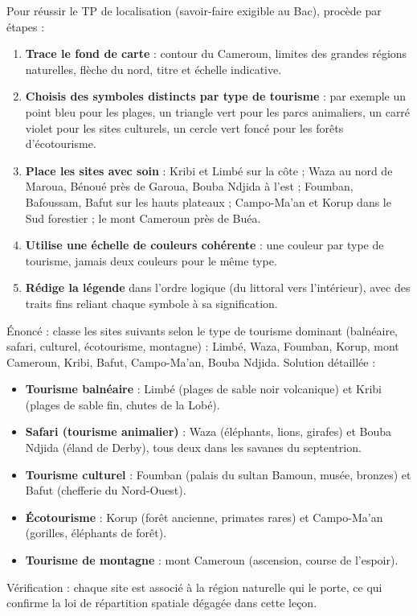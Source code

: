 \documentclass[11pt]{article}
\begin{document}
\begin{methode}
Pour réussir le TP de localisation (savoir-faire exigible au Bac), procède par étapes :
\begin{enumerate}
\item \textbf{Trace le fond de carte} : contour du Cameroun, limites des grandes régions naturelles, flèche du nord, titre et échelle indicative.
\item \textbf{Choisis des symboles distincts par type de tourisme} : par exemple un point bleu pour les plages, un triangle vert pour les parcs animaliers, un carré violet pour les sites culturels, un cercle vert foncé pour les forêts d'écotourisme.
\item \textbf{Place les sites avec soin} : Kribi et Limbé sur la côte ; Waza au nord de Maroua, Bénoué près de Garoua, Bouba Ndjida à l'est ; Foumban, Bafoussam, Bafut sur les hauts plateaux ; Campo-Ma'an et Korup dans le Sud forestier ; le mont Cameroun près de Buéa.
\item \textbf{Utilise une échelle de couleurs cohérente} : une couleur par type de tourisme, jamais deux couleurs pour le même type.
\item \textbf{Rédige la légende} dans l'ordre logique (du littoral vers l'intérieur), avec des traits fins reliant chaque symbole à sa signification.
\end{enumerate}
\end{methode}

\begin{exoresolu}
Énoncé : classe les sites suivants selon le type de tourisme dominant (balnéaire, safari, culturel, écotourisme, montagne) : Limbé, Waza, Foumban, Korup, mont Cameroun, Kribi, Bafut, Campo-Ma'an, Bouba Ndjida.
\tcblower
Solution détaillée :
\begin{itemize}
\item \textbf{Tourisme balnéaire} : Limbé (plages de sable noir volcanique) et Kribi (plages de sable fin, chutes de la Lobé).
\item \textbf{Safari (tourisme animalier)} : Waza (éléphants, lions, girafes) et Bouba Ndjida (éland de Derby), tous deux dans les savanes du septentrion.
\item \textbf{Tourisme culturel} : Foumban (palais du sultan Bamoun, musée, bronzes) et Bafut (chefferie du Nord-Ouest).
\item \textbf{Écotourisme} : Korup (forêt ancienne, primates rares) et Campo-Ma'an (gorilles, éléphants de forêt).
\item \textbf{Tourisme de montagne} : mont Cameroun (ascension, course de l'espoir).
\end{itemize}
Vérification : chaque site est associé à la région naturelle qui le porte, ce qui confirme la loi de répartition spatiale dégagée dans cette leçon.
\end{exoresolu}
\end{document}
